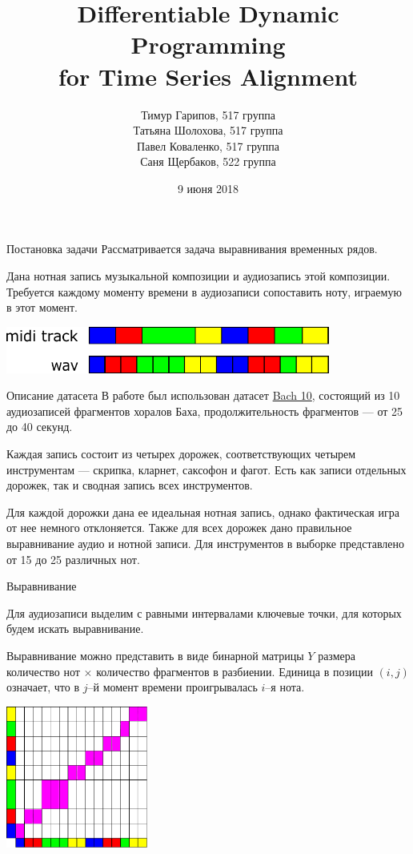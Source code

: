 \documentclass[unicode, dvipsnames]{beamer}
\title[Time Series Alignment]{Differentiable Dynamic Programming \\ for Time Series Alignment}
\author[]{Тимур Гарипов, 517 группа \\ Татьяна Шолохова, 517 группа \\ Павел Коваленко, 517 группа \\ Саня Щербаков, 522 группа}
\date{9 июня 2018}
\begin{document}
\begin{frame}
    \titlepage
\end{frame}

\begin{frame}{Постановка задачи}
	Рассматривается задача выравнивания временных рядов.
	
	\bigskip
	Дана нотная запись музыкальной композиции и аудиозапись этой композиции. Требуется каждому моменту времени в аудиозаписи сопоставить ноту, играемую в этот момент.
	
	\bigskip
	\centering
	\includegraphics[width=0.8\textwidth]{graphics/task.pdf}
\end{frame}

\begin{frame}{Описание датасета}
В работе был использован датасет \href{http://music.cs.northwestern.edu/data/Bach10.html}{Bach 10}, состоящий из 10 аудиозаписей фрагментов хоралов Баха, продолжительность фрагментов --- от 25 до 40 секунд. 

\bigskip
Каждая запись состоит из четырех дорожек, соответствующих четырем инструментам --- скрипка, кларнет, саксофон и фагот. Есть как записи отдельных дорожек, так и сводная запись всех инструментов.

\bigskip
Для каждой дорожки дана ее идеальная нотная запись, однако фактическая игра от нее немного отклоняется. Также для всех дорожек дано правильное выравнивание аудио и нотной записи. Для инструментов в выборке представлено от 15 до 25 различных нот.

\end{frame}

\begin{frame}{Выравнивание}

Для аудиозаписи выделим с равными интервалами ключевые точки, для которых будем искать выравнивание. 

Выравнивание можно представить в виде бинарной матрицы $Y$ размера количество нот $\times$ количество фрагментов в разбиении. Единица в позиции $(i, j)$ означает, что в $j$--й момент времени проигрывалась $i$--я нота.

\bigskip
\centering
\includegraphics[width=0.35\textwidth]{graphics/task2.pdf}
\end{frame}
\end{document}
